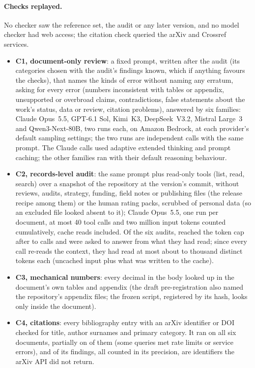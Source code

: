 \documentclass[11pt]{article}
\begin{document}
\paragraph{Checks replayed.} No checker saw the reference set, the audit or any later version, and no model checker had web access;
the citation check queried the arXiv and Crossref services.
\begin{itemize}\setlength\itemsep{0pt}
\item \textbf{C1, document-only review}: a fixed prompt, written after the audit (its categories chosen with the audit's findings known, which if anything
favours the checks), that names the kinds of error without
naming any erratum, asking for every error (numbers inconsistent with tables or
appendix, unsupported or overbroad claims, contradictions, false statements about the work's status, data or review, citation
problems), answered by six families: Claude Opus~5.5, GPT-6.1 Sol, Kimi~K3, DeepSeek~V3.2, Mistral Large~3 and
Qwen3-Next-80B, two runs each, on Amazon Bedrock, at each provider's default sampling settings; the two runs are
independent calls with the same prompt. The Claude calls used adaptive extended thinking and prompt caching; the other families ran
with their default reasoning behaviour.
\item \textbf{C2, records-level audit}: the same prompt plus read-only tools (list, read, search) over a snapshot of the
repository at the version's commit, without reviews, audits, strategy, funding, field notes or publishing files (the release recipe among them) or
the human rating packs, scrubbed of personal data (so an excluded file looked absent to it); Claude Opus~5.5, one run per document, at
most 40 tool calls and two million input tokens counted cumulatively, cache reads included. Of the six audits, \CtwoForced{} reached
the token cap after \CtwoForcedCallsLo{} to \CtwoForcedCallsHi{} calls and were asked to answer from what they had read; since every
call re-reads the context, they had read at most about \CtwoDistinctLo{} to \CtwoDistinctHi{} thousand distinct tokens each (uncached
input plus what was written to the cache).
\item \textbf{C3, mechanical numbers}: every decimal in the body looked up in the document's own tables and appendix (the
draft pre-registration also named the repository's appendix files; the frozen script, registered by its hash, looks only inside the
document).
\item \textbf{C4, citations}: every bibliography entry with an arXiv identifier or DOI checked for title, author surnames and
primary category. It ran on all six documents, partially on \CfourPartial{} of them (some queries met rate limits or service errors), and \CfourNotReturned{} of
its \CfourFindings{} findings, all counted in its precision, are identifiers the arXiv API did not return.
\end{itemize}
\end{document}
